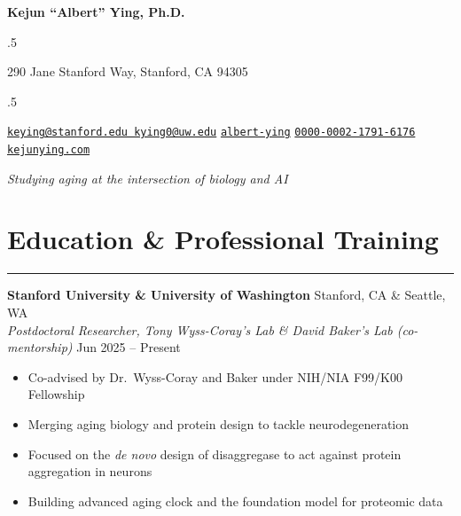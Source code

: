 \documentclass[
  11pt,
]
{article}
\providecommand{\tightlist}{%
  \setlength{\itemsep}{0pt}\setlength{\parskip}{0pt}}
\begin{document}
\centerline{\huge \bf\color{mycolor} Kejun ``Albert'' Ying, Ph.D.}

\vspace{2 mm}


\moveleft.5\hoffset\centerline{290 Jane Stanford Way, Stanford, CA
94305}
\moveleft.5\hoffset\centerline{ \faEnvelopeO \hspace{1 mm} \href{mailto:}{\tt keying@stanford.edu
\textbar{}
kying0@uw.edu} \hspace{1 mm}  \faGithub \hspace{1 mm} \href{http://github.com/albert-ying}{\tt albert-ying} \hspace{1 mm}      \hspace{.5 mm} \href{https://orcid.org/0000-0002-1791-6176}{\tt 0000-0002-1791-6176} \hspace{1 mm}  \faGlobe \hspace{1 mm} \href{http://kejunying.com}{\tt kejunying.com}   }



\vspace{2 mm}

\centerline{\textit{Studying aging at the intersection of biology and AI}}



\section{Education \& Professional
Training}\label{education-professional-training}

\hrule

\textbf{Stanford University \& University of Washington}
\hfill Stanford, CA \& Seattle, WA\\
\emph{Postdoctoral Researcher, Tony Wyss-Coray's Lab \& David Baker's
Lab (co-mentorship)} \hfill Jun 2025 -- Present

\vspace{-0.5\baselineskip}

\begin{itemize}
\tightlist
\item
  Co-advised by Dr.~Wyss-Coray and Baker under NIH/NIA F99/K00
  Fellowship
\item
  Merging aging biology and protein design to tackle neurodegeneration
\item
  Focused on the \emph{de novo} design of disaggregase to act against
  protein aggregation in neurons
\item
  Building advanced aging clock and the foundation model for proteomic
  data
\end{itemize}
\end{document}
